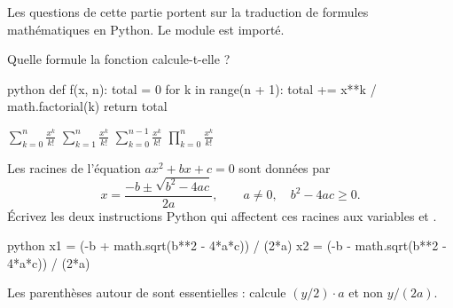 %


\begin{instructions}
  Les questions de cette partie portent sur la traduction de formules
  mathématiques en Python. Le module  est importé.
\end{instructions}

\begin{mcq}
  Quelle formule la fonction  calcule-t-elle ?
\begin{code}{python}
def f(x, n):
    total = 0
    for k in range(n + 1):
        total += x**k / math.factorial(k)
    return total
\end{code}
  \begin{choices}[columns=2]
    \correct $\displaystyle \sum_{k=0}^{n} \frac{x^k}{k!}$
    \wrong   $\displaystyle \sum_{k=1}^{n} \frac{x^k}{k!}$
    \wrong   $\displaystyle \sum_{k=0}^{n-1} \frac{x^k}{k!}$
    \wrong   $\displaystyle \prod_{k=0}^{n} \frac{x^k}{k!}$
  \end{choices}
\end{mcq}

\begin{question}[points=2, lines=4]
  Les racines de l'équation $ax^2 + bx + c = 0$ sont données par
  \[ x = \frac{-b \pm \sqrt{b^2 - 4ac}}{2a}, \qquad a \neq 0, \quad b^2 - 4ac \geq 0. \]
  Écrivez les deux instructions Python qui affectent ces racines aux
  variables  et .
  \begin{solution}
\begin{code}[numbers=none]{python}
x1 = (-b + math.sqrt(b**2 - 4*a*c)) / (2*a)
x2 = (-b - math.sqrt(b**2 - 4*a*c)) / (2*a)
\end{code}
    Les parenthèses autour de  sont essentielles :
     calcule $(y/2) \cdot a$ et non $y/(2a)$.
  \end{solution}
\end{question}

